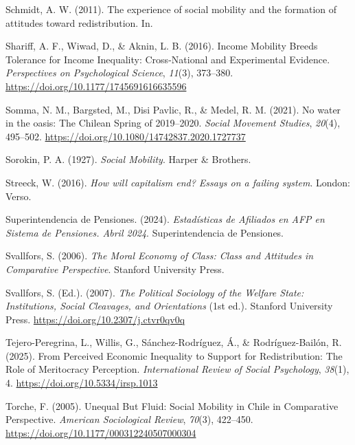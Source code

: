 \documentclass[
  13pt,
]{article}
\newlength{\cslhangindent}
\newenvironment{CSLReferences}[2] %
 {\begin{list}{}{%
  \setlength{\itemindent}{0pt}
  \setlength{\leftmargin}{0pt}
  \setlength{\parsep}{0pt}
  \ifodd #1
   \setlength{\leftmargin}{\cslhangindent}
   \setlength{\itemindent}{-1\cslhangindent}
  \fi
  \setlength{\itemsep}{#2\baselineskip}}}
 {\end{list}}
\begin{document}
\begin{CSLReferences}{1}{0}
Schmidt, A. W. (2011). The experience of social mobility and the
formation of attitudes toward redistribution. In.

Shariff, A. F., Wiwad, D., \& Aknin, L. B. (2016). Income {Mobility
Breeds Tolerance} for {Income Inequality}: {Cross-National} and
{Experimental Evidence}. \emph{Perspectives on Psychological Science},
\emph{11}(3), 373--380. \url{https://doi.org/10.1177/1745691616635596}

Somma, N. M., Bargsted, M., Disi Pavlic, R., \& Medel, R. M. (2021). No
water in the oasis: The {Chilean Spring} of 2019--2020. \emph{Social
Movement Studies}, \emph{20}(4), 495--502.
\url{https://doi.org/10.1080/14742837.2020.1727737}

Sorokin, P. A. (1927). \emph{Social {Mobility}}. Harper \& Brothers.

Streeck, W. (2016). \emph{How will capitalism end? Essays on a failing
system}. London: Verso.

Superintendencia de Pensiones. (2024). \emph{Estad{í}sticas de
{Afiliados} en {AFP} en {Sistema} de {Pensiones}. {Abril} 2024}.
Superintendencia de Pensiones.

Svallfors, S. (2006). \emph{The {Moral Economy} of {Class}: {Class} and
{Attitudes} in {Comparative Perspective}}. Stanford University Press.

Svallfors, S. (Ed.). (2007). \emph{The {Political Sociology} of the
{Welfare State}: {Institutions}, {Social Cleavages}, and {Orientations}}
(1st ed.). Stanford University Press.
\url{https://doi.org/10.2307/j.ctvr0qv0q}

Tejero-Peregrina, L., Willis, G., Sánchez-Rodríguez, Á., \&
Rodríguez-Bailón, R. (2025). From {Perceived Economic Inequality} to
{Support} for {Redistribution}: {The Role} of {Meritocracy Perception}.
\emph{International Review of Social Psychology}, \emph{38}(1), 4.
\url{https://doi.org/10.5334/irsp.1013}

Torche, F. (2005). Unequal {But Fluid}: {Social Mobility} in {Chile} in
{Comparative Perspective}. \emph{American Sociological Review},
\emph{70}(3), 422--450. \url{https://doi.org/10.1177/000312240507000304}


\end{CSLReferences}
\end{document}

